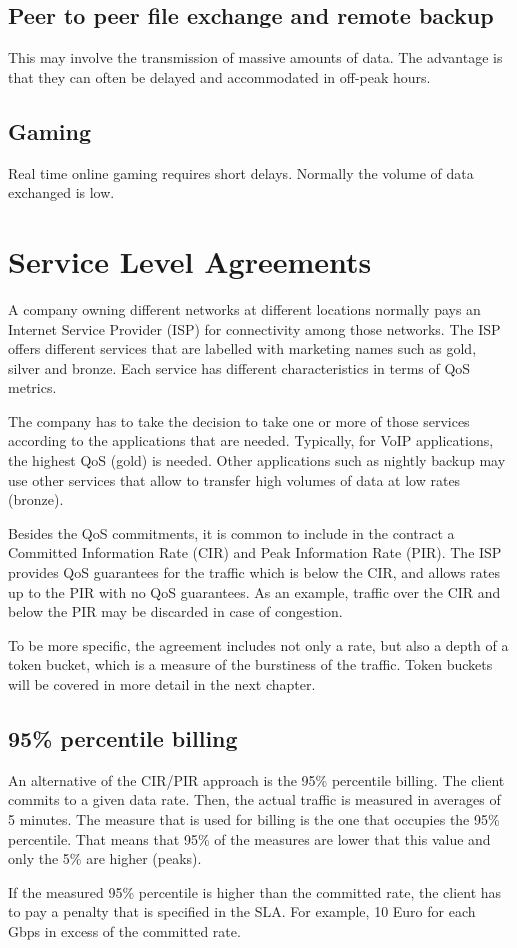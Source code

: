 \subsection{Peer to peer file exchange and remote backup}
This may involve the transmission of massive amounts of data.
The advantage is that they can often be delayed and accommodated in off-peak hours.

\subsection{Gaming}
Real time online gaming requires short delays.
Normally the volume of data exchanged is low.

\section{Service Level Agreements}

A company owning different networks at different locations normally pays an Internet Service Provider (ISP) for connectivity among those networks.
The ISP offers different services that are labelled with marketing names such as gold, silver and bronze.
Each service has different characteristics in terms of QoS metrics.

The company has to take the decision to take one or more of those services according to the applications that are needed.
Typically, for VoIP applications, the highest QoS (gold) is needed.
Other applications such as nightly backup may use other services that allow to transfer high volumes of data at low rates (bronze).

Besides the QoS commitments, it is common to include in the contract a Committed Information Rate (CIR) and Peak Information Rate (PIR).
The ISP provides QoS guarantees for the traffic which is below the CIR, and allows rates up to the PIR with no QoS guarantees.
As an example, traffic over the CIR and below the PIR may be discarded in case of congestion.

To be more specific, the agreement includes not only a rate, but also a depth of a token bucket, which is a measure of the burstiness of the traffic. 
Token buckets will be covered in more detail in the next chapter.

\subsection{95\% percentile billing}

An alternative of the CIR/PIR approach is the 95\% percentile billing.
The client commits to a given data rate.
Then, the actual traffic is measured in averages of 5 minutes.
The measure that is used for billing is the one that occupies the 95\% percentile.
That means that 95\% of the measures are lower that this value and only the 5\% are higher (peaks).

If the measured 95\% percentile is higher than the committed rate, the client has to pay a penalty that is specified in the SLA.
For example, 10 Euro for each Gbps in excess of the committed rate.
